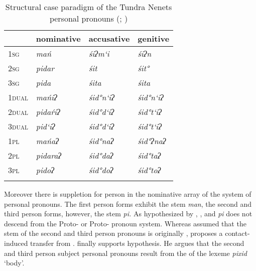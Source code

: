 \documentclass[output=paper]{LSP/langsci}
\begin{document}
\begin{table}
\begin{tabularx}{\textwidth}{XXXX} 
\lsptoprule
& nominative & accusative & genitive\\
\midrule
\textsc{1sg} & \textit{mań} & \textit{śiʔm‘i} & \textit{śiʔn}\\
\textsc{2sg} & \textit{pidar} & \textit{śit} & \textit{śit°}\\
\textsc{3sg} & \textit{pida} & \textit{śita} & \textit{śita}\\
\textsc{1dual} & \textit{mańiʔ} & \textit{śid°n‘iʔ} & \textit{śid°n‘iʔ}\\
\textsc{2dual} & \textit{pidaŕiʔ} & \textit{śid°d‘iʔ} & \textit{śid°t‘iʔ}\\
\textsc{3dual} & \textit{pid‘iʔ} & \textit{śid°d‘iʔ} & \textit{śid°t‘iʔ}\\
\textsc{1pl} & \textit{mańaʔ} & \textit{śid°naʔ} & \textit{śid°ʔnaʔ}\\
\textsc{2pl} & \textit{pidaraʔ} & \textit{śid°daʔ} & \textit{śid°taʔ}\\
\textsc{3pl} & \textit{pidoʔ} & \textit{śid°doʔ} & \textit{śid°toʔ}\\
\lspbottomrule
\end{tabularx}
\caption{Structural case paradigm of the Tundra Nenets 
personal pronouns (\citealt[14--15]{Hajdu1988Samojedischen}; \citealt{Nikolaeva2014Grammar})}\label{12-wr-tab:6}
\end{table}


Moreover there is suppletion for person in the nominative array of the  system of personal pronouns. The first person forms exhibit the stem \textit{man}, the second and third person forms, however, the stem \textit{pi.} As hypothesized by \citet{Castren1845Grammatik}, \citet{Lehtisalo1939Refleksiivipronominista}, \citet{Hajdu1953Samojeden} and \citet{Siegl2009Personal} \textit{pi} does not descend from the Proto- or Proto- pronoun system. Whereas \citet[342]{Castren1845Grammatik} assumed that the stem of the second and third person pronouns is originally , \citet{Hajdu1953Samojeden} proposes a contact-induced transfer from . \citet[120--121]{Siegl2009Personal} finally supports  hypothesis. He argues that the  second and third person subject personal pronouns result from the  of the  lexeme \textit{pixid} ‘body’. 
\end{document}
